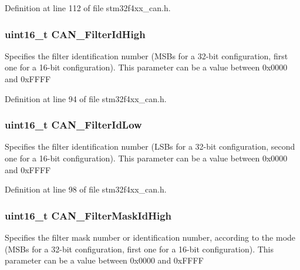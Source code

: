 Definition at line 112 of file stm32f4xx\-\_\-can.\-h.

\hypertarget{struct_c_a_n___filter_init_type_def_ac1368e531f4dd6ff08445ae664a9b96c}{
\subsubsection[{C\-A\-N\-\_\-\-Filter\-Id\-High}]{\setlength{\rightskip}{0pt plus 5cm}uint16\-\_\-t C\-A\-N\-\_\-\-Filter\-Id\-High}}\label{struct_c_a_n___filter_init_type_def_ac1368e531f4dd6ff08445ae664a9b96c}
Specifies the filter identification number (M\-S\-Bs for a 32-\/bit configuration, first one for a 16-\/bit configuration). This parameter can be a value between 0x0000 and 0x\-F\-F\-F\-F 

Definition at line 94 of file stm32f4xx\-\_\-can.\-h.

\hypertarget{struct_c_a_n___filter_init_type_def_a3ca3a0b0d3b7617b8bb5bbb7d4ca23cf}{
\subsubsection[{C\-A\-N\-\_\-\-Filter\-Id\-Low}]{\setlength{\rightskip}{0pt plus 5cm}uint16\-\_\-t C\-A\-N\-\_\-\-Filter\-Id\-Low}}\label{struct_c_a_n___filter_init_type_def_a3ca3a0b0d3b7617b8bb5bbb7d4ca23cf}
Specifies the filter identification number (L\-S\-Bs for a 32-\/bit configuration, second one for a 16-\/bit configuration). This parameter can be a value between 0x0000 and 0x\-F\-F\-F\-F 

Definition at line 98 of file stm32f4xx\-\_\-can.\-h.

\hypertarget{struct_c_a_n___filter_init_type_def_a66d56c2f432920189ae4b046c325fba6}{
\subsubsection[{C\-A\-N\-\_\-\-Filter\-Mask\-Id\-High}]{\setlength{\rightskip}{0pt plus 5cm}uint16\-\_\-t C\-A\-N\-\_\-\-Filter\-Mask\-Id\-High}}\label{struct_c_a_n___filter_init_type_def_a66d56c2f432920189ae4b046c325fba6}
Specifies the filter mask number or identification number, according to the mode (M\-S\-Bs for a 32-\/bit configuration, first one for a 16-\/bit configuration). This parameter can be a value between 0x0000 and 0x\-F\-F\-F\-F 

